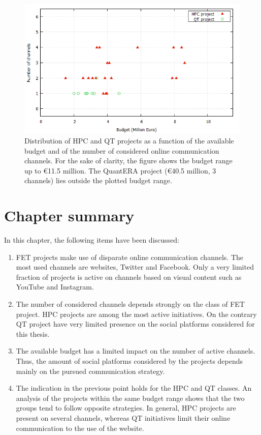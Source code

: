 \begin{figure}[!t] 
 \begin{center}
 \includegraphics[scale=0.4]{Images/Channel_budget_breakdown.png}
 \caption{Distribution of HPC and QT projects as a function of the available budget and of the number of considered online communication channels. For the sake of clarity, the figure shows the budget range up to \euro 11.5 million. The QuantERA project (\euro 40.5 million, 3 channels) lies outside the plotted budget range.}
 \label{Channel_budget_breakdown}
 \end{center}
\end{figure}

\section{Chapter summary} 
In this chapter, the following items have been discussed:

\begin{enumerate}
 \item FET projects make use of disparate online communication channels. The most used channels are websites, Twitter and Facebook. Only a very limited fraction of projects is active on channels based on visual content such as YouTube and Instagram.
 \item The number of considered channels depends strongly on the class of FET project. HPC projects are among the most active initiatives. On the contrary QT project have very limited presence on the social platforms considered for this thesis.
 \item The available budget has a limited impact on the number of active channels. Thus, the amount of social platforms considered by the projects depends mainly on the pursued communication strategy.
 \item The indication in the previous point holds for the HPC and QT classes. An analysis of the projects within the same budget range shows that the two groups tend to follow opposite strategies. In general, HPC projects are present on several channels, whereas QT initiatives limit their online communication to the use of the website.       
\end{enumerate}